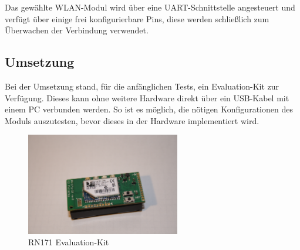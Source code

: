   Das gewählte WLAN-Modul wird über eine UART-Schnittstelle angesteuert und verfügt über einige frei konfigurierbare Pins, diese werden schließlich zum Überwachen der
  Verbindung verwendet.

  \subsection{Umsetzung}
  Bei der Umsetzung stand, für die anfänglichen Tests, ein Evaluation-Kit zur Verfügung. Dieses kann ohne weitere Hardware direkt über ein USB-Kabel mit einem PC verbunden werden.
  So ist es möglich, die nötigen Konfigurationen des Moduls auszutesten, bevor dieses in der Hardware implementiert wird.

  \begin{figure}[H]
    \begin{centering}
      \includegraphics[width = 0.6\textwidth]{Bilder/RN171_EK}
    \par\end{centering}
    \caption[RN171 Evaluation-Kit]{RN171 Evaluation-Kit\cite{RN171_EK_source}}
    \label{RN171_EK}
  \end{figure}

